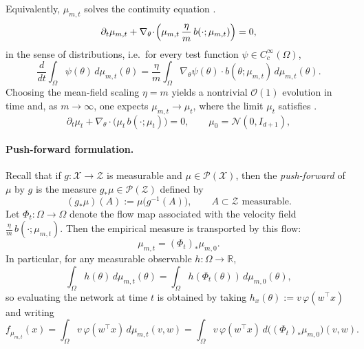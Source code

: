 Equivalently, $\mu_{m,t}$ solves the continuity equation
\citep{Rotskoff_2022,chizat2018globalconvergencegradientdescent}.
\begin{equation}
	\partial_t\mu_{m,t}
	+
	\nabla_\theta\!\cdot\!\Bigl(\mu_{m,t}\,\frac{\eta}{m}\,b(\cdot;\mu_{m,t})\Bigr)
	=
	0,
	\label{eq:mf-continuity-compact}
\end{equation}
in the sense of distributions, i.e.\ for every test function $\psi\in C_c^\infty(\Omega)$,
\[
	\frac{d}{dt}\int_\Omega \psi(\theta)\,d\mu_{m,t}(\theta)
	=
	\frac{\eta}{m}\int_\Omega \nabla_\theta\psi(\theta)\cdot b(\theta;\mu_{m,t})\,d\mu_{m,t}(\theta).
\]
Choosing the mean-field scaling $\eta=m$ yields a nontrivial $\mathcal O(1)$ evolution in time and,
as $m\to\infty$, one expects $\mu_{m,t} \to \mu_t$, where the limit $\mu_t$ satisfies
\citep{Mei2018meanfieldview,Rotskoff_2022,golikov2025deepneuralnetworkslargewidthbehavior,chizat2018globalconvergencegradientdescent}.
\begin{equation}
	\partial_t\mu_t+\nabla_\theta\!\cdot\bigl(\mu_t\,b(\cdot;\mu_t)\bigr)=0,
	\qquad \mu_0=\mathcal N (0,I_{d+1}),
	\label{eq:mf-continuity-with-initial-conditions}
\end{equation}

\paragraph{Push-forward formulation.}
Recall that if $g:\mathcal X\to\mathcal Z$ is measurable and $\mu\in\mathcal P(\mathcal X)$, then the
\emph{push-forward} of $\mu$ by $g$ is the measure $g_*\mu\in\mathcal P(\mathcal Z)$ defined by
\[
	(g_*\mu)(A):=\mu\bigl(g^{-1}(A)\bigr),
	\qquad A\subset\mathcal Z \text{ measurable}.
\]
Let $\Phi_t:\Omega\to\Omega$ denote the flow map associated with the velocity field
$\frac{\eta}{m}\,b(\cdot;\mu_{m,t})$. Then the empirical measure is transported by this flow:
\[
	\mu_{m,t} = (\Phi_t)_*\mu_{m,0}.
\]
In particular, for any measurable observable $h:\Omega\to\mathbb R$,
\[
	\int_\Omega h(\theta)\,d\mu_{m,t}(\theta)
	=
	\int_\Omega h\!\left(\Phi_t(\theta)\right)\,d\mu_{m,0}(\theta),
\]
so evaluating the network at time $t$ is obtained by taking $h_{x}(\theta):=v\,\varphi(w^\top x)$ and writing
\[
	f_{\mu_{m,t}}(x)=\int_\Omega v\,\varphi(w^\top x)\,d\mu_{m,t}(v,w)
	=\int_\Omega v\,\varphi(w^\top x)\,d\bigl((\Phi_t)_*\mu_{m,0}\bigr)(v,w).
\]

